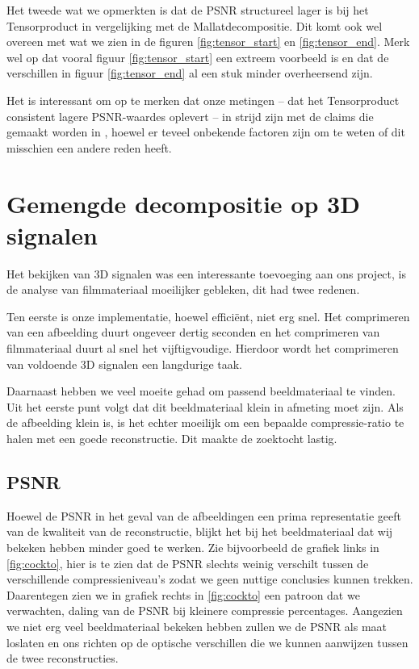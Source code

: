 Het tweede wat we opmerkten is dat de PSNR structureel lager is bij het Tensorproduct in vergelijking 
met de Mallatdecompositie. Dit komt ook wel overeen met wat we zien in de figuren \ref{fig:tensor_start} 
en \ref{fig:tensor_end}. Merk wel op dat vooral figuur \ref{fig:tensor_start} een extreem voorbeeld 
is en dat de verschillen in figuur \ref{fig:tensor_end} al een stuk minder overheersend zijn.

Het is interessant om op te merken dat onze metingen -- dat het Tensorproduct consistent lagere 
PSNR-waardes oplevert -- in strijd zijn met de claims die gemaakt worden in \cite{tensor_vs_mallat}, 
hoewel er teveel onbekende factoren zijn om te weten of dit misschien een andere reden heeft.

\section{Gemengde decompositie op 3D signalen}
Het bekijken van 3D signalen was een interessante toevoeging aan ons project, is de analyse  
van filmmateriaal moeilijker gebleken, dit had twee redenen.

Ten eerste is onze implementatie, hoewel effici\"ent, niet erg snel. Het comprimeren van een 
afbeelding duurt ongeveer dertig seconden en het comprimeren van filmmateriaal duurt al snel het 
vijftigvoudige. Hierdoor wordt het comprimeren van voldoende 3D signalen een langdurige taak.

Daarnaast hebben we veel moeite gehad om passend beeldmateriaal te vinden. Uit het eerste punt volgt 
dat dit beeldmateriaal klein in afmeting moet zijn. Als de afbeelding klein is, is het echter moeilijk
om een bepaalde compressie-ratio te halen met een goede reconstructie. Dit maakte de zoektocht lastig.

\subsection{PSNR}
Hoewel de PSNR in het geval van de afbeeldingen een prima representatie geeft van de kwaliteit van de 
reconstructie, blijkt het bij het beeldmateriaal dat wij bekeken hebben minder goed te werken. 
Zie bijvoorbeeld de grafiek links in \ref{fig:cockto}, hier is te zien dat de PSNR slechts weinig verschilt
tussen de verschillende compressieniveau's zodat we geen nuttige conclusies kunnen trekken.
Daarentegen zien we in grafiek rechts in \ref{fig:cockto} een patroon dat we verwachten, daling van de PSNR
bij kleinere compressie percentages.
Aangezien we niet erg veel beeldmateriaal bekeken hebben zullen we de PSNR als maat loslaten en ons richten 
op de optische verschillen die we kunnen aanwijzen tussen de twee reconstructies.

